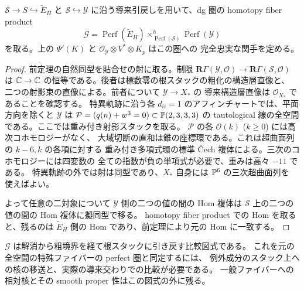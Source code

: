 \begin{corollary}[二成分の制限図式での完全忠実な比較]\label{vbm:cor:matching}
$\mathcal S\to S\hookrightarrow\widetilde E_H$ と
$\mathcal S\hookrightarrow\mathcal Y$ に沿う導来引戻しを用いて、dg 圏の
homotopy fiber product
\[
 \mathcal G=\operatorname{Perf}(\widetilde E_H)
      \mathop{\times}^{h}_{\operatorname{Perf}(\mathcal S)}
                          \operatorname{Perf}(\mathcal Y)
\]
を取る。上の $\Psi'(K)$ と
$\mathcal O_{\mathcal Y}\otimes V^*\otimes K_p$ はこの圏への
完全忠実な関手を定める。
\end{corollary}
\begin{proof}
前定理の自然同型を貼合せの射に取る。制限
$\mathbf R\Gamma(\mathcal Y,\mathcal O)\to\mathbf R\Gamma(\mathcal S,\mathcal O)$ は
$\mathbb C\to\mathbb C$ の恒等である。後者は標数零の根スタックの粗化の構造層直像と、
二つの射影束の直像による。前者について $\mathcal Y\to X_*$ の
導来構造層直像は $\mathcal O_{X_*}$ であることを確認する。
特異軌跡に沿う各 $d_{ii}=1$ のアフィンチャートでは、平面方向を除くと
$\mathcal Y$ は $\mathcal P=(q(n)+w^3=0)\subset\mathbb P(2,3,3,3)$ の
tautological 線の全空間である。ここでは重み付き射影スタックを取る。
$\mathcal P$ の各 $\mathcal O(k)$ ($k\ge0$) には高次コホモロジーがなく、
大域切断の直和は錐の座標環である。これは超曲面列の $k-6,k$ の各項に対する
重み付き多項式環の標準 Čech 複体による。三次のコホモロジーには四変数の
全ての指数が負の単項式が必要で、重みは高々 $-11$ である。
特異軌跡の外では射は同型であり、$X_*$ 自身には $\mathbb P^6$ の三次超曲面列を
使えばよい。

よって任意の二対象について $\mathcal Y$ 側の二つの値の間の Hom 複体は
$\mathcal S$ 上の二つの値の間の Hom 複体に擬同型で移る。
homotopy fiber product での Hom を取ると、残るのは
$\widetilde E_H$ 側の Hom であり、前定理により元の Hom に一致する。
\end{proof}
$\mathcal G$ は解消から粗境界を経て根スタックに引き戻す比較図式である。
これを元の全空間の特殊ファイバーの perfect 圏と同定するには、
例外成分のスタック上への核の移送と、実際の導来交わりでの比較が必要である。
一般ファイバーへの相対核とその smooth proper 性はこの図式の外に残る。

